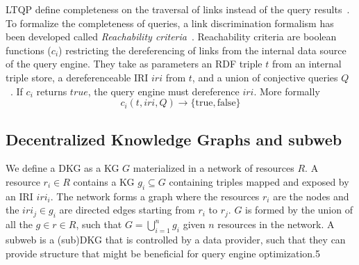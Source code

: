 LTQP define completeness on the traversal of links instead of the query results~\cite{Hartig2012}.
To formalize the completeness of queries, a link discrimination formalism has been developed called \emph{Reachability criteria}~\cite{Hartig2012}.
Reachability criteria are boolean functions ($c_i$) restricting the dereferencing of links from the internal data source of the query engine.
They take as parameters an RDF triple $t$ from an internal triple store, a dereferenceable IRI $iri$ from $t$, and a union of conjective queries $Q$~\cite{Hartig2012}.
If $c_i$ returns $true$, the query engine must dereference $iri$.
More formally
\begin{equation}\label{eq:reachabilityCriteria}
c_i(t, iri, Q) \rightarrow \{\mathrm{true}, \mathrm{false}\}
\end{equation}

\subsection{Decentralized Knowledge Graphs and subweb}\label{sec:dkg}

We define a DKG as a KG $G$ materialized in a network of resources $R$.
A resource $r_i \in R$ contains a KG $g_i \subseteq G$ containing triples mapped and exposed by an IRI $iri_i$.
The network forms a graph where the resources $r_i$ are the nodes and the $iri_j \in g_i$ are directed edges starting from $r_i$ to $r_j$.
$G$ is formed by the union of all the $g \in r \in R$, such that $G = \bigcup_{i=1}^{n}g_i$ given $n$ resources in the network.
A subweb is a (sub)DKG that is controlled by a data provider, such that they can provide structure that might be beneficial for query engine optimization.5